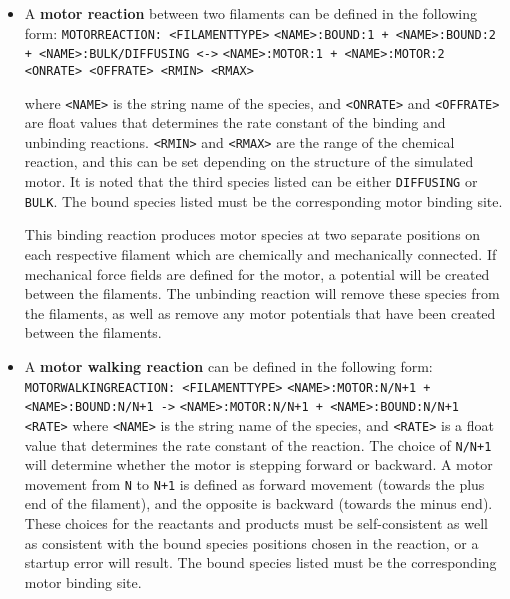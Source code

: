 \documentclass[11pt, oneside]{article}   	%
\begin{document}
\begin{itemize}
 
 \item A \textbf{motor reaction} between two filaments can be defined in the following form:\newline\newline
\texttt{MOTORREACTION: <FILAMENTTYPE>}\newline
\texttt{<NAME>:BOUND:1 + <NAME>:BOUND:2 + <NAME>:BULK/DIFFUSING <->}\newline
\texttt{<NAME>:MOTOR:1 + <NAME>:MOTOR:2 <ONRATE> <OFFRATE> <RMIN> <RMAX>}\newline

where \texttt{<NAME>} is the string name of the species, and \texttt{<ONRATE>} and \texttt{<OFFRATE>} are float values that determines the rate constant of the binding and unbinding reactions. \texttt{<RMIN>} and \texttt{<RMAX>} are the range of the chemical reaction, and this can be set depending on the structure of the simulated motor. It is noted that the third species listed can be either \texttt{DIFFUSING} or \texttt{BULK}. The bound species listed must be the corresponding motor binding site.

This binding reaction produces motor species at two separate positions on each respective filament which are chemically and mechanically connected. If mechanical force fields are defined for the motor, a potential will be created between the filaments. The unbinding reaction will remove these species from the filaments, as well as remove any motor potentials that have been created between the filaments.


\item A \textbf{motor walking reaction} can be defined in the following form:\newline\newline
\texttt{MOTORWALKINGREACTION: <FILAMENTTYPE>}\newline
\texttt{<NAME>:MOTOR:N/N+1 + <NAME>:BOUND:N/N+1 ->}\newline
\texttt{<NAME>:MOTOR:N/N+1 + <NAME>:BOUND:N/N+1 <RATE>}\newline\newline
where \texttt{<NAME>} is the string name of the species, and \texttt{<RATE>} is a float value that determines the rate constant of the reaction. The choice of \texttt{N/N+1} will determine whether the motor is stepping forward or backward. A motor movement from \texttt{N} to \texttt{N+1} is defined as forward movement (towards the plus end of the filament), and the opposite is backward (towards the minus end). These choices for the reactants and products must be self-consistent as well as consistent with the bound species positions chosen in the reaction, or a startup error will result. The bound species listed must be the corresponding motor binding site.


\end{itemize}
\end{document}
